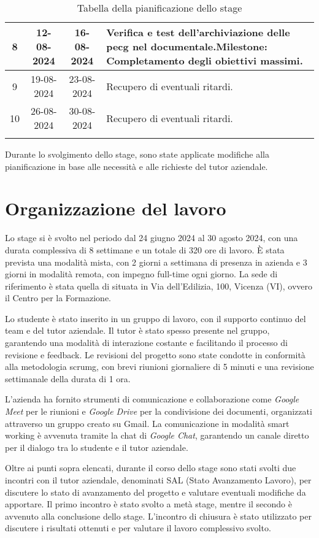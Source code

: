 \begin{longtable}{|c|c|c|p{8cm}|}
    \hline
    8                  & 12-08-2024   & 16-08-2024  &
    Verifica e test dell'archiviazione delle \gls{pecg} nel documentale.\newline \textbf{Milestone:} Completamento degli obiettivi massimi. \\
    \hline
    9                  & 19-08-2024   & 23-08-2024  &
    Recupero di eventuali ritardi. \\
    \hline
    10                 & 26-08-2024   & 30-08-2024  &
    Recupero di eventuali ritardi. \\
    \hline
    \caption{Tabella della pianificazione dello stage} \\
\end{longtable}

Durante lo svolgimento dello stage, sono state applicate modifiche alla pianificazione in base alle necessità e alle richieste del tutor aziendale.

\section{Organizzazione del lavoro}

Lo stage si è svolto nel periodo dal 24 giugno 2024 al 30 agosto 2024, con una durata complessiva di 8 settimane e un totale di 320 ore di lavoro. È stata prevista una modalità mista, con 2 giorni a settimana di presenza in azienda e 3 giorni in modalità remota, con impegno full-time ogni giorno. La sede di riferimento è stata quella di \myCompany situata in Via dell'Edilizia, 100, Vicenza (VI), ovvero il Centro per la Formazione.

Lo studente è stato inserito in un gruppo di lavoro, con il supporto continuo del team e del tutor aziendale. Il tutor è stato spesso presente nel gruppo, garantendo una modalità di interazione costante e facilitando il processo di revisione e feedback. Le revisioni del progetto sono state condotte in conformità alla metodologia \gls{scrumg}, con brevi riunioni giornaliere di 5 minuti e una revisione settimanale della durata di 1 ora.

L'azienda ha fornito strumenti di comunicazione e collaborazione come \emph{Google Meet} per le riunioni e \emph{Google Drive} per la condivisione dei documenti, organizzati attraverso un gruppo creato su Gmail. La comunicazione in modalità smart working è avvenuta tramite la chat di \emph{Google Chat}, garantendo un canale diretto per il dialogo tra lo studente e il tutor aziendale.

Oltre ai punti sopra elencati, durante il corso dello stage sono stati svolti due incontri con il tutor aziendale, denominati SAL (Stato Avanzamento Lavoro), per discutere lo stato di avanzamento del progetto e valutare eventuali modifiche da apportare. Il primo incontro è stato svolto a metà stage, mentre il secondo è avvenuto alla conclusione dello stage. L'incontro di chiusura è stato utilizzato per discutere i risultati ottenuti e per valutare il lavoro complessivo svolto.